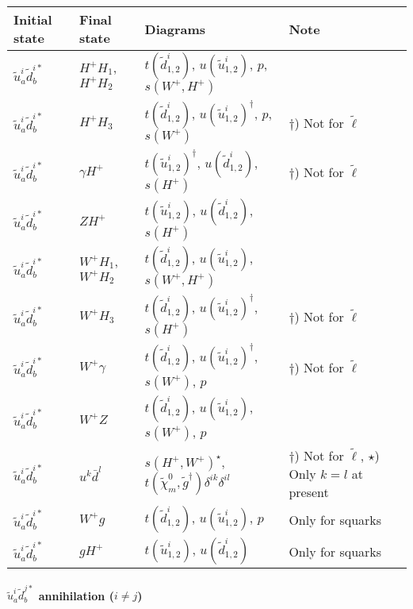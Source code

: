 \begin{center}
\begin{tabular}{llll} \hline
{\bfseries Initial state} & {\bfseries Final state} &
{\bfseries Diagrams} & {\bfseries Note} \\ \hline \tabspace
$\tilde{u}^i_a \tilde{d}^{i*}_b$ & $H^+ H_1$, $H^+ H_2$ &
$t(\tilde{d}^i_{1,2})$, $u(\tilde{u}^i_{1,2})$, $p$, $s(W^+,H^+)$  \\
$\tilde{u}^i_a \tilde{d}^{i*}_b$ & $H^+ H_3$ &
$t(\tilde{d}^i_{1,2})$, $u(\tilde{u}^i_{1,2})^\dagger$, $p$, $s(W^+)$ 
& $\dagger$) Not for $\tilde{\ell}$ \\
$\tilde{u}^i_a \tilde{d}^{i*}_b$ & $\gamma H^+$ &
$t(\tilde{u}^i_{1,2})^\dagger$, $u(\tilde{d}^i_{1,2})$, $s(H^+)$ 
& $\dagger$) Not for $\tilde{\ell}$ \\
$\tilde{u}^i_a \tilde{d}^{i*}_b$ & $Z H^+$ &
$t(\tilde{u}^i_{1,2})$, $u(\tilde{d}^i_{1,2})$, $s(H^+)$ \\
$\tilde{u}^i_a \tilde{d}^{i*}_b$ & $W^+ H_1$, $W^+ H_2$  &
$t(\tilde{d}^i_{1,2})$, $u(\tilde{u}^i_{1,2})$, $s(W^+,H^+)$ \\
$\tilde{u}^i_a \tilde{d}^{i*}_b$ & $W^+ H_3$  &
$t(\tilde{d}^i_{1,2})$, $u(\tilde{u}^i_{1,2})^\dagger$, $s(H^+)$ 
& $\dagger$) Not for $\tilde{\ell}$ \\
$\tilde{u}^i_a \tilde{d}^{i*}_b$ & $W^+ \gamma$  &
$t(\tilde{d}^i_{1,2})$, $u(\tilde{u}^i_{1,2})^\dagger$, $s(W^+)$, $p$ 
& $\dagger$) Not for $\tilde{\ell}$ \\
$\tilde{u}^i_a \tilde{d}^{i*}_b$ & $W^+ Z$  &
$t(\tilde{d}^i_{1,2})$, $u(\tilde{u}^i_{1,2})$, $s(W^+)$, $p$ \\
$\tilde{u}^i_a \tilde{d}^{i*}_b$ & $u^k \bar{d}^l$ &
$s(H^+,W^+)^\star$, $t(\tilde{\chi}_m^0,\tilde{g}^\dagger)\delta^{ik}\delta^{il}$ 
& \parbox[t]{4cm}{$\dagger$) Not for $\tilde{\ell}$, $\star$) Only $k=l$ at present} \\ 
$\tilde{u}^i_a \tilde{d}^{i*}_b$ & $W^+ g$ &
$t(\tilde{d}^i_{1,2})$, $u(\tilde{u}^i_{1,2})$, $p$
& Only for squarks \\ 
$\tilde{u}^i_a \tilde{d}^{i*}_b$ & $g H^+$ &
$t(\tilde{u}^i_{1,2})$, $u(\tilde{d}^i_{1,2})$
& Only for squarks \\ \hline
\end{tabular}
\end{center}

\paragraph{$\tilde{u}_a^i \tilde{d}_{b}^{j*}$ annihilation ($i \ne j$)}


